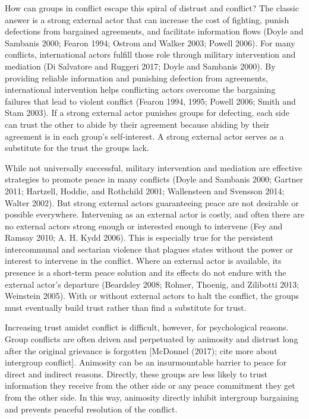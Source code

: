 \documentclass[11pt]{article}
\begin{document}
How can groups in conflict escape this spiral of distrust and conflict?
The classic answer is a strong external actor that can increase the cost
of fighting, punish defections from bargained agreements, and facilitate
information flows (Doyle and Sambanis 2000; Fearon 1994; Ostrom and
Walker 2003; Powell 2006). For many conflicts, international actors
fulfill those role through military intervention and mediation (Di
Salvatore and Ruggeri 2017; Doyle and Sambanis 2000). By providing
reliable information and punishing defection from agreements,
international intervention helps conflicting actors overcome the
bargaining failures that lead to violent conflict (Fearon 1994, 1995;
Powell 2006; Smith and Stam 2003). If a strong external actor punishes
groups for defecting, each side can trust the other to abide by their
agreement because abiding by their agreement is in each group's
self-interest. A strong external actor serves as a substitute for the
trust the groups lack.

While not universally successful, military intervention and mediation
are effective strategies to promote peace in many conflicts (Doyle and
Sambanis 2000; Gartner 2011; Hartzell, Hoddie, and Rothchild 2001;
Wallensteen and Svensson 2014; Walter 2002). But strong external actors
guaranteeing peace are not desirable or possible everywhere. Intervening
as an external actor is costly, and often there are no external actors
strong enough or interested enough to intervene (Fey and Ramsay 2010; A.
H. Kydd 2006). This is especially true for the persistent intercommunal
and sectarian violence that plagues states without the power or interest
to intervene in the conflict. Where an external actor is available, its
presence is a short-term peace solution and its effects do not endure
with the external actor's departure (Beardsley 2008; Rohner, Thoenig,
and Zilibotti 2013; Weinstein 2005). With or without external actors to
halt the conflict, the groups must eventually build trust rather than
find a substitute for trust.

Increasing trust amidst conflict is difficult, however, for
psychological reasons. Group conflicts are often driven and perpetuated
by animosity and distrust long after the original grievance is forgotten
{[}McDonnel (2017); cite more about intergroup conflict{]}. Animosity
can be an insurmountable barrier to peace for direct and indirect
reasons. Directly, these groups are less likely to trust information
they receive from the other side or any peace commitment they get from
the other side. In this way, animosity directly inhibit intergroup
bargaining and prevents peaceful resolution of the conflict.
\end{document}
